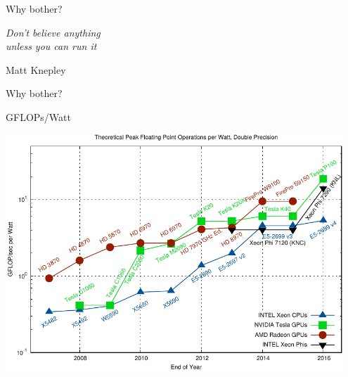 

\begin{frame}{Why bother?}
  \begin{center}
   \LARGE \hspace*{-1cm} \emph{Don't believe anything \\ \hspace*{1cm}unless you can run it}
  \end{center}
  \hspace*{6cm}Matt Knepley
\end{frame}



\begin{frame}{Why bother?}
  \begin{block}{GFLOPs/Watt}
  \begin{center} \vspace*{-0.5cm}
   \includegraphics[width=0.95\textwidth]{figures/gflops-per-watt-dp.pdf}
  \end{center}
  \end{block}
\end{frame}



